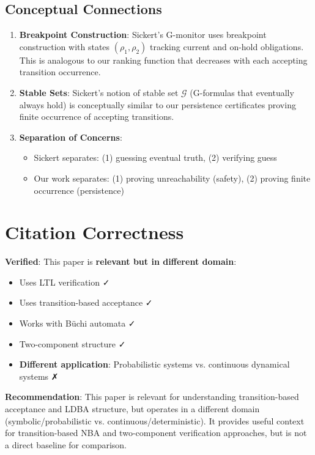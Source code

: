 \documentclass{article}
\begin{document}
\subsection{Conceptual Connections}

\begin{enumerate}
    \item \textbf{Breakpoint Construction}: Sickert's G-monitor uses breakpoint construction with states $(\rho_1, \rho_2)$ tracking current and on-hold obligations. This is analogous to our ranking function that decreases with each accepting transition occurrence.

    \item \textbf{Stable Sets}: Sickert's notion of stable set $\mathcal{G}$ (G-formulas that eventually always hold) is conceptually similar to our persistence certificates proving finite occurrence of accepting transitions.

    \item \textbf{Separation of Concerns}:
    \begin{itemize}
        \item Sickert separates: (1) guessing eventual truth, (2) verifying guess
        \item Our work separates: (1) proving unreachability (safety), (2) proving finite occurrence (persistence)
    \end{itemize}
\end{enumerate}

\section{Citation Correctness}

\textbf{Verified}: This paper is \textbf{relevant but in different domain}:
\begin{itemize}
    \item Uses LTL verification ✓
    \item Uses transition-based acceptance ✓
    \item Works with Büchi automata ✓
    \item Two-component structure ✓
    \item \textbf{Different application}: Probabilistic systems vs. continuous dynamical systems ✗
\end{itemize}

\textbf{Recommendation}: This paper is relevant for understanding transition-based acceptance and LDBA structure, but operates in a different domain (symbolic/probabilistic vs. continuous/deterministic). It provides useful context for transition-based NBA and two-component verification approaches, but is not a direct baseline for comparison.
\end{document}
